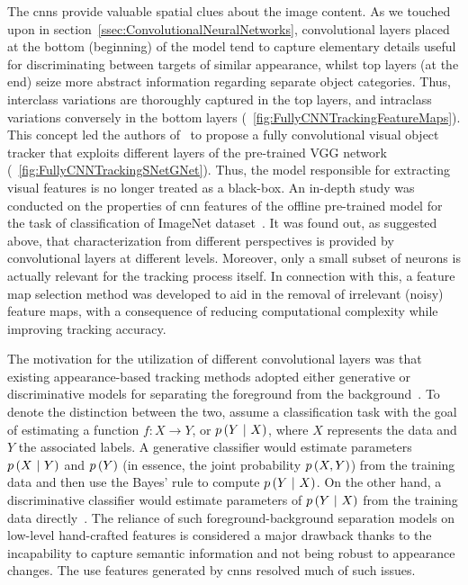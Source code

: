 The \glspl{cnn} provide valuable spatial clues about the image content. As we touched upon in section~\ref{ssec:ConvolutionalNeuralNetworks}, convolutional layers placed at the bottom (beginning) of the model tend to capture elementary details useful for discriminating between targets of similar appearance, whilst top layers (at the end) seize more abstract information regarding separate object categories. Thus, interclass variations are thoroughly captured in the top layers, and intraclass variations conversely in the bottom layers (\figstr{}~\ref{fig:FullyCNNTrackingFeatureMaps}). This concept led the authors of~\cite{wang2015votcnn} to propose a fully convolutional visual object tracker that exploits different layers of the pre-trained VGG network~\cite{simonyan2015verydeepcnn} (\figstr{}~\ref{fig:FullyCNNTrackingSNetGNet}). Thus, the model responsible for extracting visual features is no longer treated as a black-box. An in-depth study was conducted on the properties of \gls{cnn} features of the offline pre-trained model for the task of classification of ImageNet dataset~\cite{deng2009imagenet}. It was found out, as suggested above, that characterization from different perspectives is provided by convolutional layers at different levels. Moreover, only a small subset of neurons is actually relevant for the tracking process itself. In connection with this, a feature map selection method was developed to aid in the removal of irrelevant (noisy) feature maps, with a consequence of reducing computational complexity while improving tracking accuracy.

The motivation for the utilization of different convolutional layers was that existing appearance-based tracking methods adopted either generative or discriminative models for separating the foreground from the background~\cite{wang2015votcnn}. To denote the distinction between the two, assume a classification task with the goal of estimating a function $f: X \to Y$, or $p \left( Y \ | \ X \right)$, where $X$ represents the data and $Y$ the associated labels. A generative classifier would estimate parameters $p \left( X \ | \ Y \right)$ and $p \left( Y \right)$ (in essence, the joint probability $p \left( X, Y \right)$) from the training data and then use the Bayes' rule to compute $p \left( Y \ | \ X \right)$. On the other hand, a discriminative classifier would estimate parameters of $p \left( Y \ | \ X \right)$ from the training data directly~\cite{ng2002discriminative}. The reliance of such foreground-background separation models on low-level hand-crafted features is considered a major drawback thanks to the incapability to capture semantic information and not being robust to appearance changes. The use features generated by \glspl{cnn} resolved much of such issues.

